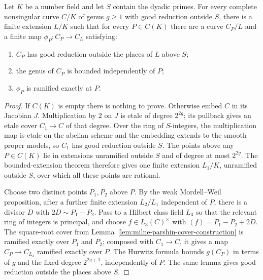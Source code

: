 \begin{theorem}
\label{thm:milne-parshin-cover}

Let $K$ be a number field and let $S$ contain the dyadic primes.  For every
complete nonsingular curve $C/K$ of genus $g\ge1$ with good reduction outside
$S$, there is a finite extension $L/K$ such that for every $P\in C(K)$ there
are a curve $C_P/L$ and a finite map $\phi_P:C_P\to C_L$ satisfying:
\begin{enumerate}
\item $C_P$ has good reduction outside the places of $L$ above $S$;
\item the genus of $C_P$ is bounded independently of $P$;
\item $\phi_P$ is ramified exactly at $P$.
\end{enumerate}
\end{theorem}

\begin{proof}

If $C(K)$ is empty there is nothing to prove.  Otherwise embed $C$ in its
Jacobian $J$.  Multiplication by $2$ on $J$ is etale of degree $2^{2g}$; its
pullback gives an etale cover $C_1\to C$ of that degree.  Over the ring of
$S$-integers, the multiplication map is etale on the abelian scheme and the
embedding extends to the smooth proper models, so $C_1$ has good reduction
outside $S$.  The points above any $P\in C(K)$ lie in extensions unramified
outside $S$ and of degree at most $2^{2g}$.  The bounded-extension theorem
therefore gives one finite extension $L_1/K$, unramified outside $S$, over
which all these points are rational.

Choose two distinct points $P_1,P_2$ above $P$.  By the weak Mordell--Weil
proposition, after a further finite extension $L_2/L_1$ independent of $P$,
there is a divisor $D$ with $2D\sim P_1-P_2$.  Pass to a Hilbert class field
$L_3$ so that the relevant ring of integers is principal, and choose
$f\in L_3(C)^\times$ with
$(f)=P_1-P_2+2D$.  The square-root cover from
Lemma~\ref{lem:milne-parshin-cover-construction} is ramified exactly over
$P_1$ and $P_2$; composed with $C_1\to C$, it gives a map
$C_P\to C_{L_3}$ ramified exactly over $P$.  The Hurwitz formula bounds
$g(C_P)$ in terms of $g$ and the fixed degree $2^{2g+1}$, independently of
$P$.  The same lemma gives good reduction outside the places above $S$.

\end{proof}


